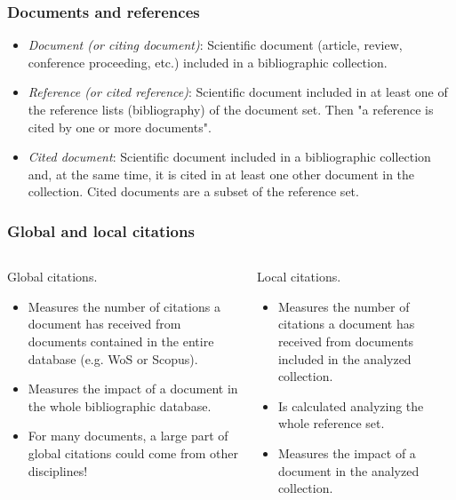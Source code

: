 \documentclass[aspectratio=169]{beamer}
\begin{document}
\begin{frame}
  \frametitle{Documents and references}
  \begin{itemize}
    \item \emph{Document (or citing document)}: Scientific document (article, 
      review, conference proceeding, etc.) included in a bibliographic 
      collection.
    \item \emph{Reference (or cited reference)}: Scientific document included 
      in at least one of the reference lists (bibliography) of the document 
      set. Then "a reference is cited by one or more documents".
    \item \emph{Cited document}: Scientific document included in a 
      bibliographic collection and, at the same time, it is cited in at least
      one other document in the collection. Cited documents are a subset of the
      reference set.
  \end{itemize}
\end{frame}

\begin{frame}
  \frametitle{Global and local citations}
  \begin{columns}
    \begin{column}{0.5\textwidth}
      Global citations.
      \begin{itemize}
        \item Measures the number of citations a document has received from 
          documents contained in the entire database (e.g. WoS or Scopus).
        \item Measures the impact of a document in the whole bibliographic 
          database.
        \item For many documents, a large part of global citations could come 
          from other disciplines!
      \end{itemize}
    \end{column}
    \begin{column}{0.5\textwidth}
      Local citations.
      \begin{itemize}
        \item Measures the number of citations a document has received from 
          documents included in the analyzed collection. 
        \item Is calculated analyzing the whole reference set. 
        \item Measures the impact of a document in the analyzed collection.
      \end{itemize}
    \end{column}
  \end{columns}
\end{frame}
\end{document}
